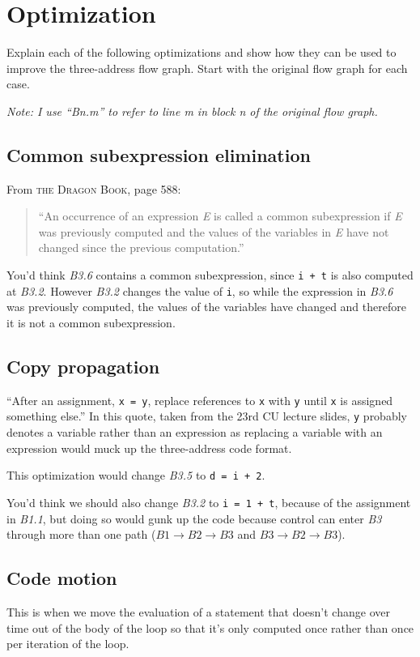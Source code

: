 \section{Optimization}
Explain each of the following optimizations and show how they can be used to improve the three-address flow graph.
Start with the original flow graph for each case.

\emph{Note: I use ``Bn.m'' to refer to line m in block n of the original flow graph.}
\subsection{Common subexpression elimination}
From \textsc{the Dragon Book}, page 588:
\begin{quote}
``An occurrence of an expression \emph{E} is called a common subexpression if \emph{E} was previously computed and the values of the variables in \emph{E} have not changed since the previous computation.''
\end{quote}

You'd think \textit{B3.6} contains a common subexpression, since \texttt{i + t} is also computed at \textit{B3.2}.
However \textit{B3.2} changes the value of \texttt{i}, so while the expression in \textit{B3.6} was previously computed, the values of the variables have changed and therefore it is not a common subexpression.

\subsection{Copy propagation}
``After an assignment, \texttt{x = y}, replace references to \texttt{x} with \texttt{y} until \texttt{x} is assigned something else.''
In this quote, taken from the 23rd CU lecture slides, \texttt{y} probably denotes a variable rather than an expression as replacing a variable with an expression would muck up the three-address code format.

This optimization would change \textit{B3.5} to \texttt{d = i + 2}.

You'd think we should also change \textit{B3.2} to \texttt{i = 1 + t}, because of the assignment in \textit{B1.1}, but doing so would gunk up the code because control can enter \textit{B3} through more than one path ($\mathit{B1} \rightarrow \mathit{B2} \rightarrow \mathit{B3}$ and $\mathit{B3} \rightarrow \mathit{B2} \rightarrow \mathit{B3}$).

\subsection{Code motion}
This is when we move the evaluation of a statement that doesn't change over time out of the body of the loop so that it's only computed once rather than once per iteration of the loop.


